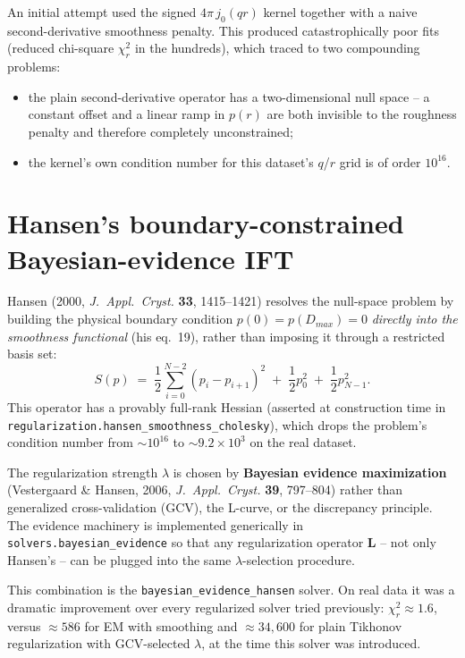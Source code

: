 \documentclass[11pt,a4paper]{article}
\begin{document}
An initial attempt used the signed $4\pi\, j_0(qr)$ kernel together
with a naive second-derivative smoothness penalty. This produced
catastrophically poor fits (reduced chi-square $\chi^2_r$ in the
hundreds), which traced to two compounding problems:
\begin{itemize}[nosep]
  \item the plain second-derivative operator has a two-dimensional
    null space -- a constant offset and a linear ramp in $p(r)$ are
    both invisible to the roughness penalty and therefore completely
    unconstrained;
  \item the kernel's own condition number for this dataset's $q$/$r$
    grid is of order $10^{16}$.
\end{itemize}

\section{Hansen's boundary-constrained Bayesian-evidence IFT}

Hansen (2000, \emph{J.\ Appl.\ Cryst.} \textbf{33}, 1415--1421) resolves
the null-space problem by building the physical boundary condition
$p(0) = p(D_{max}) = 0$ \emph{directly into the smoothness functional}
(his eq.~19), rather than imposing it through a restricted basis set:
\begin{equation}
  S(p) \;=\; \frac{1}{2}\sum_{i=0}^{N-2} (p_i - p_{i+1})^2
             \;+\; \frac{1}{2}p_0^2 \;+\; \frac{1}{2}p_{N-1}^2 .
  \label{eq:hansen-penalty}
\end{equation}
This operator has a provably full-rank Hessian (asserted at
construction time in
\texttt{regularization.hansen\_smoothness\_cholesky}), which drops the
problem's condition number from $\sim\!10^{16}$ to $\sim\!9.2\times
10^{3}$ on the real dataset.

The regularization strength $\lambda$ is chosen by \textbf{Bayesian
evidence maximization} (Vestergaard \& Hansen, 2006, \emph{J.\ Appl.\
Cryst.} \textbf{39}, 797--804) rather than generalized cross-validation
(GCV), the L-curve, or the discrepancy principle. The evidence
machinery is implemented generically in
\texttt{solvers.bayesian\_evidence} so that any regularization operator
$\mathbf{L}$ -- not only Hansen's -- can be plugged into the same
$\lambda$-selection procedure.

This combination is the \texttt{bayesian\_evidence\_hansen} solver.
On real data it was a dramatic improvement over every regularized
solver tried previously: $\chi^2_r \approx 1.6$, versus $\approx 586$
for EM with smoothing and $\approx 34{,}600$ for plain
Tikhonov regularization with GCV-selected $\lambda$, at the time this
solver was introduced.
\end{document}
